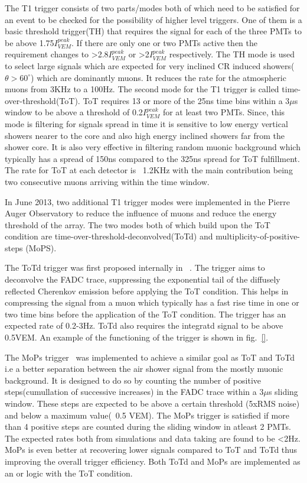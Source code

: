 The T1 trigger consists of two parts/modes both of which need to be satisfied for an event to be checked for the possibility of higher level triggers. One of them is a basic threshold trigger(TH) that requires the signal for each of the three PMTs to be above 1.75$I_{VEM}^{peak}$. If there are only one or two PMTs active then the requirement changes to >2.8$I_{VEM}^{peak}$ or >2$I_{VEM}^{peak}$ respectively. The TH mode is used to select large signals which are expected for very inclined CR induced showers($\theta >60^{\circ}$) which are dominantly muons. It reduces the rate for the atmospheric muons from 3KHz to a 100Hz. The second mode for the T1 trigger is called time-over-threshold(ToT). ToT requires 13 or more of the 25ns time bins within a 3$\mu$s window to be above a threshold of 0.2$I_{VEM}^{peak}$ for at least two PMTs. Since, this mode is filtering for signals spread in time it is sensitive to low energy vertical showers nearer to the core and also high energy inclined showers far from the shower core. It is also very effective in filtering random muonic background which typically has a spread of 150ns compared to the 325ns spread for ToT fulfillment. The rate for ToT at each detector is ~1.2KHz with the main contribution being two consecutive muons arriving within the time window. 


In June 2013, two additional T1 trigger modes were implemented in the Pierre Auger Observatory to reduce the influence of muons and reduce the energy threshold of the array. The two modes both of which build upon the ToT condition are time-over-threshold-deconvolved(ToTd) and multiplicity-of-positive-steps (MoPS).

The ToTd trigger was first proposed internally in ~\cite{}. The trigger aims to deconvolve the FADC trace, suppressing the exponential tail of the diffusely reflected Cherenkov emission before applying the ToT condition. This helps in compressing the signal from a muon which typically has a fast rise time in one or two time bins before the application of the ToT condition. The trigger has an expected rate of 0.2-3Hz. ToTd also requires the integratd signal to be above 0.5VEM. An example of the functioning of the trigger is shown in fig.~\ref{}. 

The MoPs trigger~\cite{} was implemented to achieve a similar goal as ToT and ToTd i.e a better separation between the air shower signal from the mostly muonic background. It is designed to do so by counting the number of positive steps(cumullation of successive increases) in the FADC trace within a 3$\mu$s sliding window. These steps are expected to be above a certain threshold (5xRMS noise) and below a maximum value(~0.5 VEM). The MoPs trigger is satisfied if more than 4 positive steps are counted during the sliding window in atleast 2 PMTs. The expected rates both from simulations and data taking are found to be <2Hz. MoPs is even better at recovering lower signals compared to ToT and ToTd thus improving the overall trigger efficiency. Both ToTd and MoPs are implemented as an or logic with the ToT condition. 

